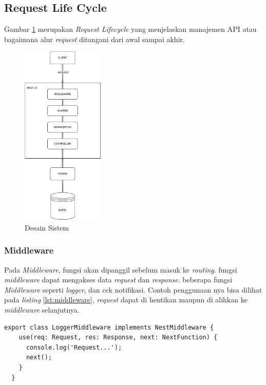 \subsection{Request Life Cycle}
Gambar \ref{sistem-desain} merupakan \textit{Request Lifecycle} yang menjelaskan manajemen API atau bagaimana alur \textit{request} ditangani dari awal sampai akhir.
\begin{figure}[h]
  \centering
  \includegraphics[width=0.35\textwidth]{drawio/sistem-desain.drawio.pdf}
  \caption{Desain Sistem}
  \label{sistem-desain}
\end{figure}
\subsubsection{Middleware}
Pada \textit{Middleware}, fungsi akan dipanggil sebelum masuk ke \textit{routing}. fungsi \textit{middleware} dapat mengakses data \textit{request} dan \textit{response}. beberapa fungsi \textit{Middleware} seperti \textit{logger}, dan cek notifikasi. Contoh penggunaan nya bisa dilihat pada \textit{listing} \ref{lst:middleware}, \textit{request} dapat di hentikan maupun di alihkan ke \textit{middleware} selanjutnya.
\begin{lstlisting}[caption={Middleware},label={lst:middleware}]
  export class LoggerMiddleware implements NestMiddleware {
    use(req: Request, res: Response, next: NextFunction) {
      console.log('Request...');
      next();
    }
  }  
\end{lstlisting}

